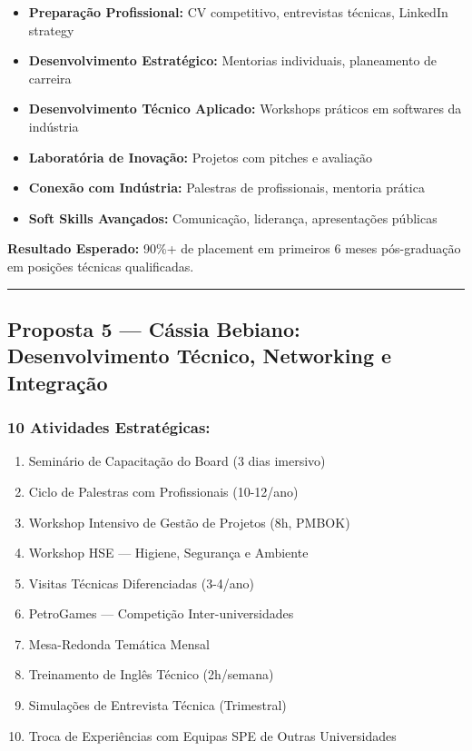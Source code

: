 \documentclass[12pt,a4paper]{article}
\begin{document}
\begin{itemize}[itemsep=0.2cm]
    \item \textbf{Preparação Profissional:} CV competitivo, entrevistas técnicas, LinkedIn strategy
    
    \item \textbf{Desenvolvimento Estratégico:} Mentorias individuais, planeamento de carreira
    
    \item \textbf{Desenvolvimento Técnico Aplicado:} Workshops práticos em softwares da indústria
    
    \item \textbf{Laboratória de Inovação:} Projetos com pitches e avaliação
    
    \item \textbf{Conexão com Indústria:} Palestras de profissionais, mentoria prática
    
    \item \textbf{Soft Skills Avançados:} Comunicação, liderança, apresentações públicas
\end{itemize}

\textbf{Resultado Esperado:} 90\%+ de placement em primeiros 6 meses pós-graduação em posições técnicas qualificadas.

\textcolor{spe-secondary}{\hspace{0.5cm}\rule{0.4\linewidth}{0.8pt}}

\subsection{Proposta 5 — Cássia Bebiano: Desenvolvimento Técnico, Networking e Integração}

\subsubsection*{10 Atividades Estratégicas:}

\begin{enumerate}[itemsep=0.15cm]
    \item Seminário de Capacitação do Board (3 dias imersivo)
    \item Ciclo de Palestras com Profissionais (10-12/ano)
    \item Workshop Intensivo de Gestão de Projetos (8h, PMBOK)
    \item Workshop HSE — Higiene, Segurança e Ambiente
    \item Visitas Técnicas Diferenciadas (3-4/ano)
    \item PetroGames — Competição Inter-universidades
    \item Mesa-Redonda Temática Mensal
    \item Treinamento de Inglês Técnico (2h/semana)
    \item Simulações de Entrevista Técnica (Trimestral)
    \item Troca de Experiências com Equipas SPE de Outras Universidades
\end{enumerate}
\end{document}
